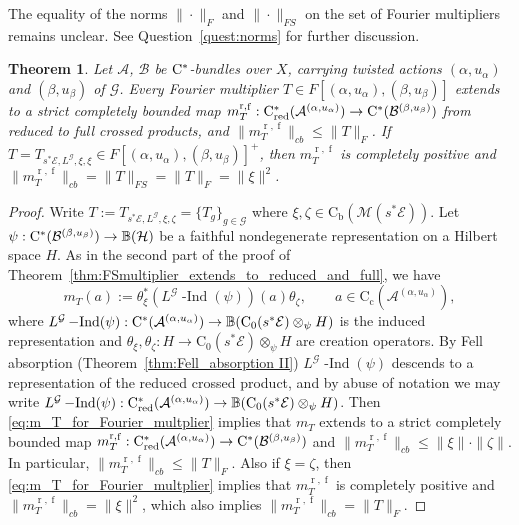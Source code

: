 \documentclass[11 pt, leqno]{amsart}
\numberwithin{equation}{section}
\theoremstyle{plain}
\newtheorem{thm}{Theorem}[section]
\theoremstyle{definition}
\newcommand*{\contc}{\mathrm{C_c}}%
\newcommand*{\contz}{\mathrm{C_0}}%
\newcommand*{\contb}{\mathrm{C_b}}%
\DeclareMathOperator{\red}{red}%
\DeclareMathOperator{\rd}{r}%
\DeclareMathOperator{\f}{f}%
\DeclareMathOperator{\dashind}{-Ind}
\DeclareMathOperator{\supp}{supp}
\renewcommand{\H}{\mathcal H}
\newcommand{\B}{\mathcal B}
\newcommand{\BB}{\mathbb B}
\newcommand{\M}{\mathcal M}
\newcommand{\m}{m}
\newcommand{\G}{\mathcal G} %
\newcommand{\EE}{\mathcal E}
\newcommand{\A}{\mathcal A}
\newcommand{\cst}{\ifmmode\mathrm{C}^*\else{$\mathrm{C}^*$}\fi}
\begin{document}
The equality of the norms $\|\cdot\|_F$ and $\|\cdot\|_{FS}$ on the set of Fourier multipliers remains unclear. 
See Question~\ref{quest:norms} for further discussion.


\begin{thm}\label{thm:Fmultipliers_are_reduced_to_full} 
Let $\A$, $\B$ be $\cst$-bundles over $X$, carrying twisted actions $(\alpha,u_\alpha)$ and $(\beta,u_\beta)$ of $\G$. 
Every Fourier multiplier $T\in F[(\alpha,u_{\alpha}),(\beta,u_{\beta})]$ extends to a strict completely bounded map 	$\m_T^{\rd,\f} : \cst_{\red}(\A^{(\alpha,u_{\alpha})}) \to \cst(\B^{(\beta,u_{\beta})})$ from reduced to full crossed products, and $\| \m_T^{\rd,\f} \|_{cb} \leq \|T\|_{F}$. 
If $T = T_{s^*\EE,L^\G,\xi,\xi} \in F[(\alpha,u_{\alpha}),(\beta,u_{\beta})]^+$, then $\m_T^{\rd,\f}$ is completely positive and $\| \m_T^{\rd,\f} \|_{cb} = \| T \|_{FS} = \| T \|_{F} = \|\xi\|^2$.
\end{thm}
\begin{proof} 
Write $T := T_{s^*\EE,L^{\G},\xi,\zeta} = \{ T_g \}_{g\in \G}$ where $\xi,\zeta\in \contb(\M(s^*\EE))$. 
Let $\psi : \cst(\B^{(\beta,u_{\beta})}) \to \BB(\H)$ be a faithful nondegenerate representation on a Hilbert space $H$. 
As in the second part of the proof of Theorem~\ref{thm:FSmultiplier_extends_to_reduced_and_full}, we have 
\begin{equation}\label{eq:m_T_for_Fourier_multplier}
    \m_T(a) := \theta_\xi^* (L^\G\dashind(\psi))(a) \theta_\zeta, \qquad a\in\contc(\A^{(\alpha,u_{\alpha})}) ,
\end{equation}
where $L^\G\dashind(\psi) : \cst(\A^{(\alpha,u_{\alpha})})\to \BB(\contz(s^*\EE)\otimes_{\psi}H)$ is the induced representation and $\theta_\xi, \theta_{\zeta} : H \to   \contz(s^*\EE)\otimes_{\psi} H$ are creation operators. 
By Fell absorption (Theorem~\ref{thm:Fell_absorption II}) $L^\G\dashind(\psi)$ descends to a representation of the reduced crossed product, and by abuse of notation we may write $L^\G\dashind(\psi) : \cst_{\red}(\A^{(\alpha,u_{\alpha})}) \to \BB(\contz(s^*\EE)\otimes_{\psi}H)$.
Then \eqref{eq:m_T_for_Fourier_multplier} implies that $\m_T$ extends to a strict completely bounded map $\m_T^{\rd,\f} : \cst_{\red} (\A^{(\alpha,u_{\alpha})}) \to \cst(\B^{(\beta,u_{\beta})})$ and $\| \m_T^{\rd,\f} \|_{cb} \leq \| \xi \| \cdot \|\zeta\|$. 
In particular, $\|\m_T^{\rd,\f}\|_{cb} \leq \|T\|_{F}$. 
Also if $\xi=\zeta$, then \eqref{eq:m_T_for_Fourier_multplier} implies that $\m_T^{\rd,\f}$ is completely positive and $\| \m_T^{\rd,\f} \|_{cb} =\|\xi\|^2$, which also implies $\| \m_T^{\rd,\f} \|_{cb} =\|T\|_{F}$.
\end{proof}
\end{document}
